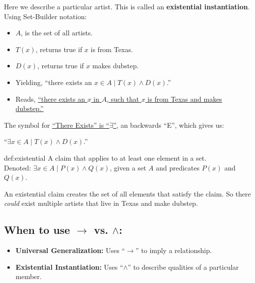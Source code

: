 \noindent
Here we describe a particular artist. This is called an {\textbf{existential instantiation}}.\\

\noindent
Using Set-Builder notation:
\begin{itemize}
    \item $A$, is the set of all artists.
    \item $T(x)$, returns true if $x$ is from Texas.
    \item $D(x)$, returns true if $x$ makes dubstep.
    \item Yielding, ``there exists an $x\in A \mid T(x) \land D(x)$.''
    \item Reads, \underline{``there exists an $x$ in $A$, such that $x$ is from Texas and makes dubstep.''}
\end{itemize}

\noindent
The symbol for \underline{``There Exists'' is ``$\exists$''}, an backwards ``E'', which gives us:

\begin{center}
    \Large
    ``$\exists x \in A \mid T(x) \land D(x)$.''\\
\end{center}

\begin{Def}{def:existential}
    A claim that applies to at least one element in a set.\\
    Denoted: $\exists x \in A \mid P(x) \land Q(x)$, given a set $A$ and predicates $P(x)$ and $Q(x)$.
\end{Def}

\noindent
An existential claim creates the set of all elements that satisfy the claim. So there \textit{could}
exist multiple artists that live in Texas and make dubstep.

\noindent
\subsection*{When to use $\rightarrow$ vs. $\land$:}
\begin{itemize}
    \item \textbf{Universal Generalization:} Uses ``$\rightarrow$'' to imply a relationship.
    \item \textbf{Existential Instantiation:} Uses ``$\land$'' to describe qualities of a particular member.
\end{itemize}

\newpage

